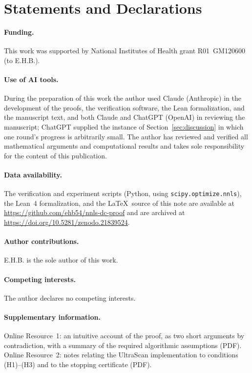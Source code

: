 \documentclass[pdflatex,sn-mathphys-num]{sn-jnl}
\theoremstyle{thmstyleone}
\theoremstyle{thmstyletwo}
\begin{document}
\section*{Statements and Declarations}

\paragraph{Funding.}
This work was supported by National Institutes of Health grant
R01~GM120600 (to E.H.B.).

\paragraph{Use of AI tools.}
During the preparation of this work the author used Claude (Anthropic)
in the development of the proofs, the verification software, the Lean
formalization, and the manuscript text, and both Claude and ChatGPT
(OpenAI) in reviewing the manuscript; ChatGPT supplied the instance of
Section~\ref{sec:discussion} in which one round's progress is
arbitrarily small. The author has reviewed and verified all mathematical
arguments and computational results and takes sole responsibility for
the content of this publication.

\paragraph{Data availability.}
{\sloppy
The verification and experiment scripts (Python, using
\texttt{scipy.optimize.nnls}), the Lean~4 formalization, and the
\LaTeX\ source of this note are available at \url{https://github.com/ehb54/nnls-dc-proof}
and are archived at \url{https://doi.org/10.5281/zenodo.21839524}.
\par}

\paragraph{Author contributions.}
E.H.B. is the sole author of this work.

\paragraph{Competing interests.}
The author declares no competing interests.

\paragraph{Supplementary information.}
Online Resource~1: an intuitive account of the proof, as two short
arguments by contradiction, with a summary of the required algorithmic
assumptions (PDF). Online Resource~2: notes relating the UltraScan
implementation to conditions (H1)--(H3) and to the stopping
certificate (PDF).

\setlength{\bibsep}{2pt plus 0.3ex}

\end{document}
